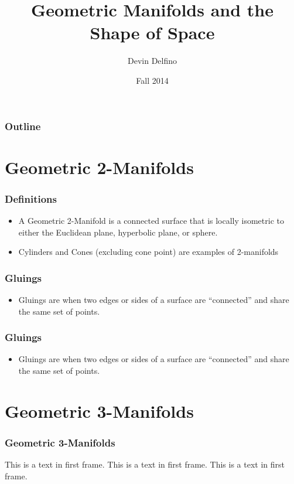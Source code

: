 \documentclass[14pt]{beamer}
\title{Geometric Manifolds and the Shape of Space}
\author{Devin Delfino}
\institute{MATH 331: Geometry}
\date{Fall 2014}
\begin{document}
\frame{\titlepage}

\begin{frame}
\frametitle{Outline}
\tableofcontents
\end{frame}

\section{Geometric 2-Manifolds} %
\begin{frame}
\frametitle{Definitions}
	\begin{itemize}
		\item A \alert{Geometric 2-Manifold} is a connected surface that is locally isometric to either the Euclidean plane, hyperbolic plane, or sphere.
		\item Cylinders and Cones (excluding cone point) are examples of 2-manifolds
	\end{itemize}
\end{frame}

\begin{frame}
\frametitle{Gluings}
	\begin{itemize}
		\item \alert{Gluings} are when two edges or sides of a surface are ``connected'' and share the same set of points.
	\end{itemize}
\end{frame}

\begin{frame}
\frametitle{Gluings}
	\begin{itemize}
		\item \alert{Gluings} are when two edges or sides of a surface are ``connected'' and share the same set of points.
	\end{itemize}
\end{frame}

\section{Geometric 3-Manifolds} %
\begin{frame}
\frametitle{Geometric 3-Manifolds}
This is a text in first frame. This is a text in first frame. This is a text in first frame.
\end{frame}
\end{document}
